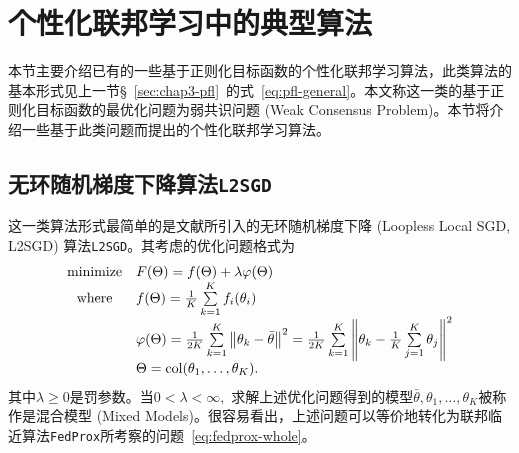 \section{个性化联邦学习中的典型算法}
\label{sec:chap3-pfl-algo}


本节主要介绍已有的一些基于正则化目标函数的个性化联邦学习算法，此类算法的基本形式见上一节\S~\ref{sec:chap3-pfl}~的式~\eqref{eq:pfl-general}。本文称这一类的基于正则化目标函数的最优化问题为弱共识问题 (Weak Consensus Problem)。本节将介绍一些基于此类问题而提出的个性化联邦学习算法。

\subsection*{无环随机梯度下降算法\texttt{L2SGD}}

这一类算法形式最简单的是文献\cite{hanzely2020federated}所引入的无环随机梯度下降 (Loopless Local SGD, L2SGD) 算法\texttt{L2SGD}。其考虑的优化问题格式为
\begin{equation}
\label{eq:l2sgd}
\begin{array}{cl}
\operatorname*{minimize} & F(\Theta) = f(\Theta) + \lambda \varphi(\Theta) \\
\text{where} & f(\Theta) = \frac{1}{K} \sum\limits_{k=1}^K f_i(\theta_i) \\
& \varphi(\Theta) = \frac{1}{2K} \sum\limits_{k=1}^K \left\lVert \theta_k - \bar{\theta} \right\rVert^2 = \frac{1}{2K} \sum\limits_{k=1}^K \left\lVert \theta_k - \frac{1}{K} \sum\limits_{j=1}^K \theta_j \right\rVert^2 \\
& \Theta = \operatorname{col}(\theta_1, \ldots, \theta_K).
\end{array}
\end{equation}
其中$\lambda \geqslant 0$是罚参数。当$0 < \lambda < \infty,$ 求解上述优化问题得到的模型$\bar{\theta}, \theta_1, \ldots, \theta_K$被称作是混合模型 (Mixed Models)。很容易看出，上述问题可以等价地转化为联邦临近算法\texttt{FedProx}所考察的问题~\eqref{eq:fedprox-whole}。



